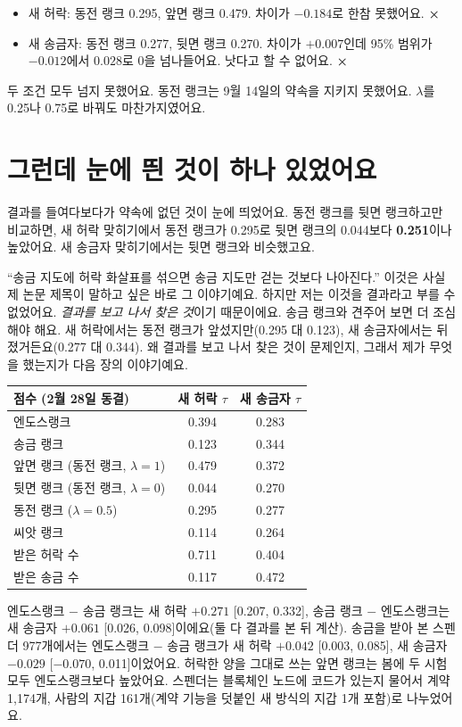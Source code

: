 \begin{itemize}
\item 새 허락: 동전 랭크 0.295, 앞면 랭크 0.479. 차이가 $-0.184$로 한참 못했어요. \textcolor{roseline}{\textbf{×}}
\item 새 송금자: 동전 랭크 0.277, 뒷면 랭크 0.270. 차이가 $+0.007$인데 95\% 범위가 $-0.012$에서 $0.028$로 0을 넘나들어요. 낫다고 할 수 없어요. \textcolor{roseline}{\textbf{×}}
\end{itemize}

두 조건 모두 넘지 못했어요.
동전 랭크는 9월 14일의 약속을 지키지 못했어요.
$\lambda$를 0.25나 0.75로 바꿔도 마찬가지였어요.

\section{그런데 눈에 띈 것이 하나 있었어요}

결과를 들여다보다가 약속에 없던 것이 눈에 띄었어요.
동전 랭크를 뒷면 랭크하고만 비교하면, 새 허락 맞히기에서 동전 랭크가 0.295로 뒷면 랭크의 0.044보다 \textbf{0.251}이나 높았어요.
새 송금자 맞히기에서는 뒷면 랭크와 비슷했고요.

“송금 지도에 허락 화살표를 섞으면 송금 지도만 걷는 것보다 나아진다.”
이것은 사실 제 논문 제목이 말하고 싶은 바로 그 이야기예요.
하지만 저는 이것을 결과라고 부를 수 없었어요.
\emph{결과를 보고 나서 찾은 것}이기 때문이에요.
송금 랭크와 견주어 보면 더 조심해야 해요.
새 허락에서는 동전 랭크가 앞섰지만(0.295 대 0.123), 새 송금자에서는 뒤졌거든요(0.277 대 0.344).
왜 결과를 보고 나서 찾은 것이 문제인지, 그래서 제가 무엇을 했는지가 다음 장의 이야기예요.

\begin{deeper}[진짜 숫자]
\begin{center}
\small
\begin{tabular}{@{}lcc@{}}
\toprule
점수 (2월 28일 동결) & 새 허락 $\tau$ & 새 송금자 $\tau$ \\
\midrule
엔도스랭크 & 0.394 & 0.283 \\
송금 랭크 & 0.123 & 0.344 \\
앞면 랭크 (동전 랭크, $\lambda=1$) & 0.479 & 0.372 \\
뒷면 랭크 (동전 랭크, $\lambda=0$) & 0.044 & 0.270 \\
동전 랭크 ($\lambda=0.5$) & 0.295 & 0.277 \\
씨앗 랭크 & 0.114 & 0.264 \\
받은 허락 수 & 0.711 & 0.404 \\
받은 송금 수 & 0.117 & 0.472 \\
\bottomrule
\end{tabular}
\end{center}
엔도스랭크 $-$ 송금 랭크는 새 허락 $+0.271$ [0.207, 0.332], 송금 랭크 $-$ 엔도스랭크는 새 송금자 $+0.061$ [0.026, 0.098]이에요(둘 다 결과를 본 뒤 계산).
송금을 받아 본 스펜더 977개에서는 엔도스랭크 $-$ 송금 랭크가 새 허락 $+0.042$ [0.003, 0.085], 새 송금자 $-0.029$ [$-0.070$, 0.011]이었어요.
허락한 양을 그대로 쓰는 앞면 랭크는 봄에 두 시험 모두 엔도스랭크보다 높았어요.
스펜더는 블록체인 노드에 코드가 있는지 물어서 계약 1,174개, 사람의 지갑 161개(계약 기능을 덧붙인 새 방식의 지갑 1개 포함)로 나누었어요.
\end{deeper}


